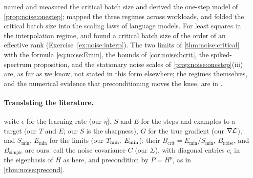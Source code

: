 \begin{refsection}
\Textcite{McCandlishEtAl2018} named and measured the critical batch size and derived the one-step model of \cref{prop:noise:onestep}; \textcite{ShallueEtAl2019} mapped the three regimes across workloads, and \textcite{KaplanEtAl2020} folded the critical batch size into the scaling laws of language models. For least squares in the interpolation regime, \textcite{MaBassilyBelkin2018} and \textcite{JainEtAl2018} found a critical batch size of the order of an effective rank (Exercise~\ref{ex:noise:interp}). The two limits of \cref{thm:noise:critical} with the formula \eqref{eq:noise:Emin}, the bounds of \cref{cor:noise:bcrit}, the spiked-spectrum proposition, and the stationary noise scales of \cref{prop:noise:onestep}(iii) are, as far as we know, not stated in this form elsewhere; the regimes themselves, and the numerical evidence that preconditioning moves the knee, are in \textcite{ZhangEtAl2019NQM}.

\paragraph{Translating the literature.} \Textcite{McCandlishEtAl2018} write $\epsilon$ for the learning rate (our $\eta$), $S$ and $E$ for the steps and examples to a target (our $T$ and $E$; our $S$ is the sharpness), $G$ for the true gradient (our $\nabla\mathcal{L}$), and $S_{\min}$, $E_{\min}$ for the limits (our $T_{\min}$, $E_{\min}$); their $B_{\mathrm{crit}}=E_{\min}/S_{\min}$, $B_{\mathrm{noise}}$, and $B_{\mathrm{simple}}$ are ours. \Textcite{ZhangEtAl2019NQM} call the noise covariance $C$ (our $\Sigma$), with diagonal entries $c_i$ in the eigenbasis of $H$ as here, and precondition by $P=H^p$, as in \cref{thm:noise:precond}.

\printchapterbib
\end{refsection}
